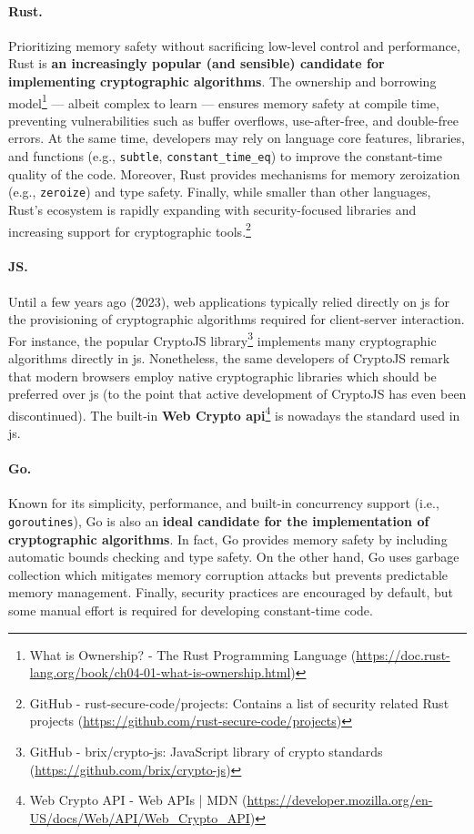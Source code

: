 \paragraph*{Rust.} Prioritizing memory safety without sacrificing low-level control and performance, Rust is \textbf{an increasingly popular (and sensible) candidate for implementing cryptographic algorithms}. The ownership and borrowing model\footnote{What is Ownership? - The Rust Programming Language (\url{https://doc.rust-lang.org/book/ch04-01-what-is-ownership.html})} --- albeit complex to learn --- ensures memory safety at compile time, preventing vulnerabilities such as buffer overflows, use-after-free, and double-free errors. At the same time, developers may rely on language core features, libraries, and functions (e.g., \texttt{subtle}, \texttt{constant\_time\_eq}) to improve the constant-time quality of the code. Moreover, Rust provides mechanisms for memory zeroization (e.g., \texttt{zeroize}) and type safety. Finally, while smaller than other languages, Rust's ecosystem is rapidly expanding with security-focused libraries and increasing support for cryptographic tools.\footnote{GitHub - rust-secure-code/projects: Contains a list of security related Rust projects (\url{https://github.com/rust-secure-code/projects})}

\paragraph*{JS.} Until a few years ago (\~2023), web applications typically relied directly on \gls{js} for the provisioning of cryptographic algorithms required for client-server interaction. For instance, the popular CryptoJS library\footnote{ GitHub - brix/crypto-js: JavaScript library of crypto standards (\url{https://github.com/brix/crypto-js})} implements many cryptographic algorithms directly in \gls{js}. Nonetheless, the same developers of CryptoJS remark that modern browsers employ native cryptographic libraries which should be preferred over \gls{js} (to the point that active development of CryptoJS has even been discontinued). The built‑in \textbf{Web Crypto \gls{api}}\footnote{Web Crypto API - Web APIs | MDN (\url{https://developer.mozilla.org/en-US/docs/Web/API/Web_Crypto_API})} is nowadays the standard used in \gls{js}.

\paragraph*{Go.} Known for its simplicity, performance, and built-in concurrency support (i.e., \texttt{goroutines}), Go is also an \textbf{ideal candidate for the implementation of cryptographic algorithms}. In fact, Go provides memory safety by including automatic bounds checking and type safety. On the other hand, Go uses garbage collection which mitigates memory corruption attacks but prevents predictable memory management. Finally, security practices are encouraged by default, but some manual effort is required for developing constant-time code.

